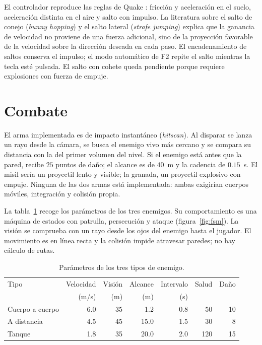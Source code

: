 \documentclass[12pt,a4paper]{article}
\begin{document}
El controlador reproduce las reglas de Quake \cite{quake}: fricción y
aceleración en el suelo, aceleración distinta en el aire y salto con impulso. La
literatura sobre el salto de conejo (\emph{bunny hopping}) y el salto lateral
(\emph{strafe jumping}) \cite{adrian,tuni,matt} explica que la ganancia de
velocidad no proviene de una fuerza adicional, sino de la proyección favorable
de la velocidad sobre la dirección deseada en cada paso. El encadenamiento de
saltos conserva el impulso; el modo automático de F2 repite el salto mientras la
tecla esté pulsada. El salto con cohete queda pendiente porque requiere
explosiones con fuerza de empuje.

\section{Combate}

El arma implementada es de impacto instantáneo (\emph{hitscan}). Al disparar se
lanza un rayo desde la cámara, se busca el enemigo vivo más cercano y se compara
su distancia con la del primer volumen del nivel. Si el enemigo está antes que
la pared, recibe $25$ puntos de daño; el alcance es de $40$~m y la cadencia de
$0.15$~s. El misil sería un proyectil lento y visible; la granada, un proyectil
explosivo con empuje. Ninguna de las dos armas está implementada: ambas
exigirían cuerpos móviles, integración y colisión propia.

La tabla~\ref{tab:enemigos} recoge los parámetros de los tres enemigos. Su
comportamiento es una máquina de estados con patrulla, persecución y ataque
(figura~\ref{fig:fsm}). La visión se comprueba con un rayo desde los ojos del
enemigo hasta el jugador. El movimiento es en línea recta y la colisión impide
atravesar paredes; no hay cálculo de rutas.

\begin{table}[htbp]
  \centering
  \small
  \begin{tabular}{@{}lrrrrrr@{}}
    \toprule
    Tipo & Velocidad & Visión & Alcance & Intervalo & Salud & Daño \\
         & (m/s) & (m) & (m) & (s) & & \\
    \midrule
    Cuerpo a cuerpo & 6.0 & 35 & 1.2 & 0.8 & 50 & 10 \\
    A distancia     & 4.5 & 45 & 15.0 & 1.5 & 30 & 8 \\
    Tanque          & 1.8 & 35 & 20.0 & 2.0 & 120 & 15 \\
    \bottomrule
  \end{tabular}
  \caption{Parámetros de los tres tipos de enemigo.}
  \label{tab:enemigos}
\end{table}
\end{document}
